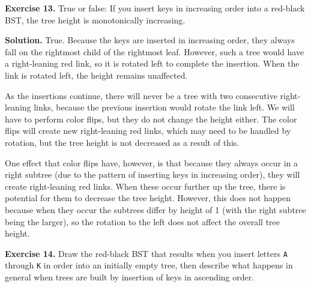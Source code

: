 \documentclass[12pt, a4paper]{article}
\newenvironment{ex}[2][Exercise]
{\par\medskip\noindent \textbf{#1 #2.}}
{\medskip}
\newenvironment{sol}[1][Solution]
{\par\medskip\noindent \textbf{#1.} }
{\medskip}
\begin{document}
	\begin{ex}{13}
		True or false: If you insert keys in increasing order into a red-black BST, the tree
		height is monotonically increasing.
	\end{ex}
	\begin{sol}
		True. Because the keys are inserted in increasing order, they always fall on the rightmost
		child of the rightmost leaf. However, such a tree would have a right-leaning red link,
		so it is rotated left to complete the insertion. When the link is rotated left, the height
		remains unaffected.
		
		As the insertions continue, there will never be a tree with two consecutive right-leaning
		links, because the previous insertion would rotate the link left. We will have
		to perform color flips, but they do not change the height either. The color flips will create
		new right-leaning red links, which may need to be handled by rotation, but the tree
		height is not decreased as a result of this.
		
		One effect that color flips have, however, is that because they always occur
		in a right subtree (due to the pattern of inserting keys in increasing order),
		they will create right-leaning red links. When these occur further up the tree,
		there is potential for them to decrease the tree height. However, this does not happen
		because when they occur the subtrees differ by height of 1 (with the right
		subtree being the larger), so the rotation to the left does not affect the overall
		tree height.
	\end{sol}
	\begin{ex}{14}
		Draw the red-black BST that results when you insert letters \texttt{A} through
		\texttt{K} in order into an initially empty tree, then describe what happens in general
		when trees are built by insertion of keys in ascending order.
	\end{ex}
\end{document}
